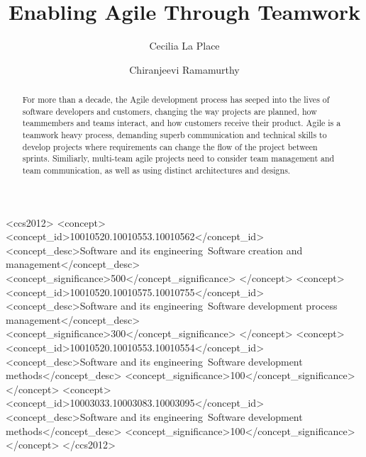 \documentclass[sigplan,screen]{acmart}
\begin{document}
%
\title{Enabling Agile Through Teamwork}

%
\author{Cecilia La Place}
\author{Chiranjeevi Ramamurthy}
\authornotemark[1]

%
\renewcommand{\shortauthors}{La Place and Ramamurthy}

%
\begin{abstract}
For more than a decade, the Agile development process has seeped into the lives of software developers and customers, changing the way projects are planned, how teammembers and teams interact, and how customers receive their product. Agile is a teamwork heavy process, demanding superb communication and technical skills to develop projects where requirements can change the flow of the project between sprints. Similiarly, multi-team agile projects need to consider team management and team communication, as well as using distinct architectures and designs. 
\end{abstract}

%
%
\begin{CCSXML}
<ccs2012>
 <concept>
  <concept_id>10010520.10010553.10010562</concept_id>
  <concept_desc>Software and its engineering~Software creation and management</concept_desc>
  <concept_significance>500</concept_significance>
 </concept>
 <concept>
  <concept_id>10010520.10010575.10010755</concept_id>
  <concept_desc>Software and its engineering~Software development process management</concept_desc>
  <concept_significance>300</concept_significance>
 </concept>
 <concept>
  <concept_id>10010520.10010553.10010554</concept_id>
  <concept_desc>Software and its engineering~Software development methods</concept_desc>
  <concept_significance>100</concept_significance>
 </concept>
 <concept>
  <concept_id>10003033.10003083.10003095</concept_id>
  <concept_desc>Software and its engineering~Software development methods</concept_desc>
  <concept_significance>100</concept_significance>
 </concept>
</ccs2012>
\end{CCSXML}
\end{document}
